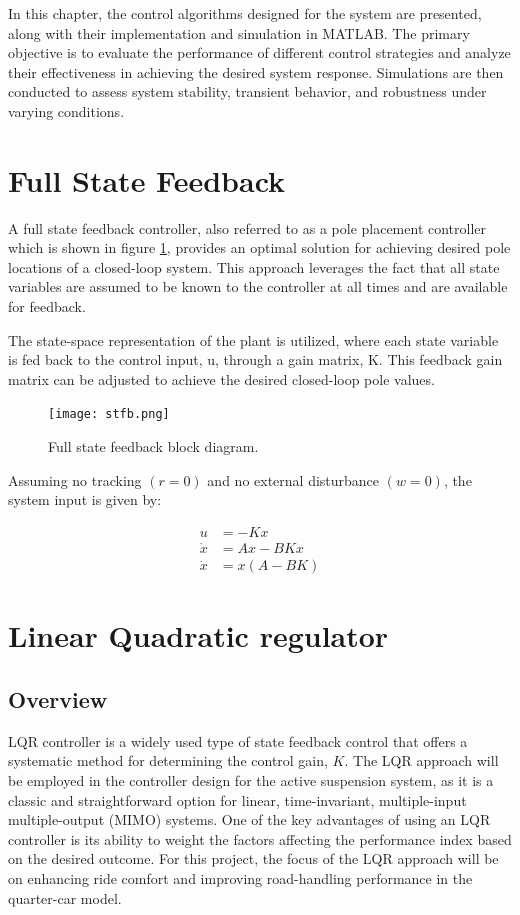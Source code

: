 In this chapter, the control algorithms designed for the system are presented, along with their implementation and simulation in MATLAB. The primary objective is to evaluate the performance of different control strategies and analyze their effectiveness in achieving the desired system response. Simulations are then conducted to assess system stability, transient behavior, and robustness under varying conditions.

\section{Full State Feedback}
A full state feedback controller, also referred to as a pole placement controller which is shown in figure \ref{fig:stfb}, provides an optimal solution for achieving desired pole locations of a closed-loop system. This approach leverages the fact that all state variables are assumed to be known to the controller at all times and are available for feedback.

The state-space representation of the plant is utilized, where each state variable is fed back to the control input, u, through a gain matrix, K. This feedback gain matrix can be adjusted to achieve the desired closed-loop pole values.

\begin{figure}[H]
	\centering
	\texttt{[image: stfb.png]}
	\caption{Full state feedback block diagram. \cite{controltutorials}
	}
	\label{fig:stfb}
\end{figure}

Assuming no tracking $(r=0)$ and no external disturbance $(w=0)$, the system input is given by:

\begin{align*}
	u &= -Kx \\
	\dot{x} &= Ax - BKx \\
	\dot{x} &= x(A - BK) 
\end{align*}

\newpage
\section{Linear Quadratic regulator}
\subsection{Overview}
LQR controller is a widely used type of state feedback control that offers a systematic method for determining the control gain, $K$. The LQR approach will be employed in the controller design for the active suspension system, as it is a classic and straightforward option for linear, time-invariant, multiple-input multiple-output (MIMO) systems. One of the key advantages of using an LQR controller is its ability to weight the factors affecting the performance index based on the desired outcome. For this project, the focus of the LQR approach will be on enhancing ride comfort and improving road-handling performance in the quarter-car model.

